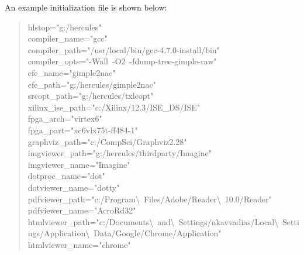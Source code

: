 \documentclass[a4paper]{article}
\begin{document}
An example initialization file is shown below:
%
\begin{quote}{\ttfamily \raggedright \noindent
hlstop="g:/hercules"\\
compiler\_name="gcc"\\
compiler\_path="/usr/local/bin/gcc-4.7.0-install/bin"\\
compiler\_opts="-Wall~-O2~-fdump-tree-gimple-raw"\\
cfe\_name="gimple2nac"\\
cfe\_path="g:/hercules/gimple2nac"\\
srcopt\_path="g:/hercules/txlcopt"\\
xilinx\_ise\_path="c:/Xilinx/12.3/ISE\_DS/ISE"\\
fpga\_arch="virtex6"\\
fpga\_part="xc6vlx75t-ff484-1"\\
graphviz\_path="c:/CompSci/Graphviz2.28"\\
imgviewer\_path="g:/hercules/thirdparty/Imagine"\\
imgviewer\_name="Imagine"\\
dotproc\_name="dot"\\
dotviewer\_name="dotty"\\
pdfviewer\_path="c:/Program\textbackslash{}~Files/Adobe/Reader\textbackslash{}~10.0/Reader"\\
pdfviewer\_name="AcroRd32"\\
htmlviewer\_path="c:/Documents\textbackslash{}~and\textbackslash{}~Settings/nkavvadias/Local\textbackslash{}~Settings/Application\textbackslash{}~Data/Google/Chrome/Application"\\
htmlviewer\_name="chrome"
}
\end{quote}

\end{document}
